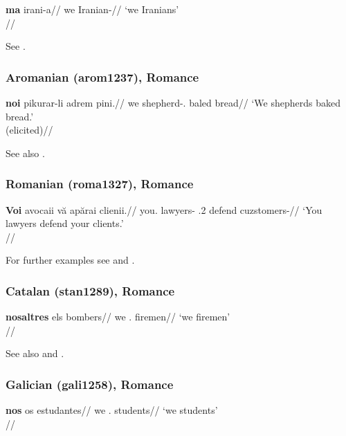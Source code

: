 \documentclass[A4paper]{article}
\begin{document}
\ex 
\begingl
\gla \textbf{ma} irani-a//
\glb we Iranian-\Pl//
\glft `we Iranians'\\\citep[212, (356)]{mahootian1997}//
\endgl
\xe

See \citet[209, 212]{mahootian1997}.

\subsubsection{Aromanian (arom1237), Romance}

\ex \begingl
\gla \textbf{noi} pikurar-li adrem pini.//
\glb we shepherd-\Def.\Pl{} baled bread//
\glft `We shepherds baked bread.'\\(elicited)//
\endgl
\xe

See also \citet[560]{hoehn2015unagr}. 

\subsubsection{Romanian (roma1327), Romance}

\ex \begingl
\gla \textbf{Voi} avocaii v\u{a} ap\u{a}rai clienii.//
\glb you.\Pl{} lawyers-\Def{} \Cl.2\Pl{} defend cuzstomers-\Def{}//
\glft `You lawyers defend your clients.'\\\citep[10, (20a)]{cornilescunicolae2014}//
\endgl
\xe

For further examples see \citet[255, 258]{mallinson1986} and \citet[6, 10, 20f.]{cornilescunicolae2014}.

\subsubsection{Catalan (stan1289), Romance}

\ex \begingl
\gla \textbf{nosaltres} els bombers//
\glb we \Det.\Pl{} firemen//
\glft `we firemen'\\\citep[290]{hualde1992catalan}//
\endgl
\xe 

See also \citet[287, 290]{hualde1992catalan} and \citet[560]{hoehn2015unagr}.

\subsubsection{Galician (gali1258), Romance}

\ex
\begingl
\gla \textbf{nos} os estudantes//
\glb we \Det.\Pl{} students//
\glft `we students'\\\citep[560, (36a)]{hoehn2015unagr}//
\endgl
\xe
\end{document}
